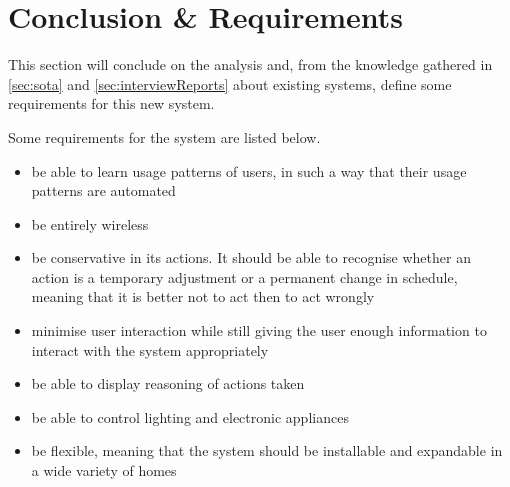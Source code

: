 \section{Conclusion \& Requirements}\label{sec:requirements}
This section will conclude on the analysis and, from the knowledge gathered in \cref{sec:sota} and \cref{sec:interviewReports} about existing systems, define some requirements for this new system.

Some requirements for the system are listed below.

\begin{itemize}
\item be able to learn usage patterns of users, in such a way that their usage patterns are automated
\item be entirely wireless
\item be conservative in its actions. It should be able to recognise whether an action is a temporary adjustment or a permanent change in schedule, meaning that it is better not to act then to act wrongly
\item minimise user interaction while still giving the user enough information to interact with the system appropriately
\item be able to display reasoning of actions taken
\item be able to control lighting and electronic appliances
\item be flexible, meaning that the system should be installable and expandable in a wide variety of homes
\end{itemize}


